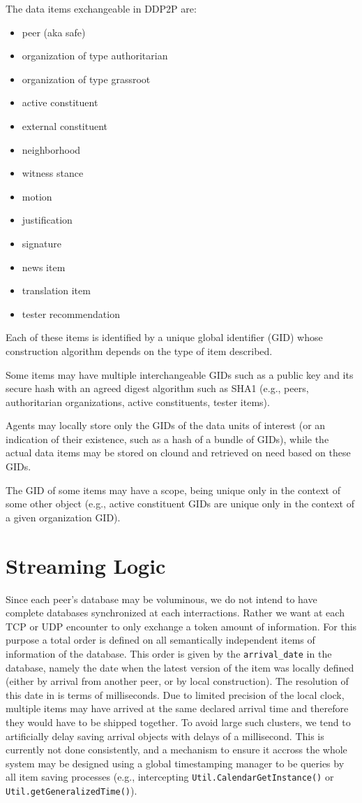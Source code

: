 \documentclass{book}
\newcommand{\mth}[1]{{\tt #1}}
\newcommand{\mmb}[1]{{\tt #1}}
\begin{document}
The data items exchangeable in DDP2P are:
\begin{itemize}
\item
peer (aka safe)
\item
organization of type authoritarian
\item
organization of type grassroot
\item
active constituent
\item
external constituent
\item
neighborhood
\item
witness stance
\item
motion
\item
justification
\item
signature
\item
news item
\item
translation item
\item
tester recommendation
\end{itemize}
Each of these items is identified by a unique global identifier (GID) whose construction algorithm depends on the type of item described.

Some items may have multiple interchangeable GIDs such as a public key and its secure hash with an agreed digest algorithm such as SHA1 (e.g., peers, authoritarian organizations, active constituents, tester items).

Agents may locally store only the GIDs of the data units of interest (or an indication of their existence, such as a hash of a bundle of GIDs),
while the actual data items may be stored on clound and retrieved on need based on these GIDs.

The GID of some items may have a scope, being unique only in the context of some other object (e.g., active constituent GIDs
are unique only in the context of a given organization GID).

\chapter{Streaming Logic}

Since each peer's database may be voluminous, we do not intend to have complete databases synchronized
at each interractions.
Rather we want at each TCP or UDP encounter to only exchange a token amount of information. For this purpose
a total order is defined on all semantically independent items of information of the database. This order is given by the
\mmb{arrival\_date} in the database, namely the date when the latest version of the item was locally defined (either by arrival 
from another peer, or by local construction). The resolution of this date in is terms of milliseconds. Due to limited precision
of the local clock, multiple items may have arrived at the same declared arrival time and therefore they would
have to be shipped together. To avoid large such clusters, we tend to artificially delay saving arrival objects with delays of a millisecond.
This is currently not done consistently, and a mechanism to ensure it accross the whole system may be designed using
a global timestamping manager to be queries by all item saving processes (e.g., intercepting \mth{Util.CalendarGetInstance()} or \mth{Util.getGeneralizedTime()}).
 
\end{document}

